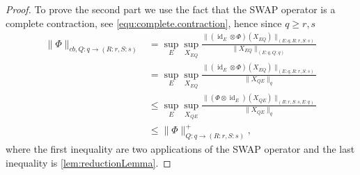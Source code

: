 \documentclass[11pt]{article}
\DeclareMathOperator{\id}{id}
\newcommand{\1}{\ensuremath{\mathbbm{1}}}
\theoremstyle{newdefinition}
\theoremstyle{newplain}
\theoremstyle{myplain}
\begin{document}
\begin{proof}
To prove the second part we use the fact that the SWAP operator is a complete contraction, see \eqref{equ:complete.contraction}, hence since $q\geq r,s$
\begin{align}
    \|\Phi\|_{cb,Q:q\to (R:r,S:s)} &= \sup_E\sup_{X_{EQ}}\frac{\|(\id_E\otimes\Phi)(X_{EQ})\|_{(E:q,R:r,S:s)}}{\|X_{EQ}\|_{(E:q,Q:q)}} \\ &= \sup_E\sup_{X_{EQ}}\frac{\|(\id_E\otimes\Phi)(X_{EQ})\|_{(E:q,R:r,S:s)}}{\|X_{QE}\|_{q}} \\&\leq \sup_E\sup_{X_{QE}}\frac{\|(\Phi\otimes \id_E)(X_{QE})\|_{(R:r,S:s,E:q)}}{\|X_{QE}\|_{q}} \\ &\leq \|\Phi\|^+_{Q:q\to (R:r,S:s)},
\end{align} where the first inequality are two applications of the SWAP operator and the last inequality is \cref{lem:reductionLemma}.
\end{proof}
\end{document}
